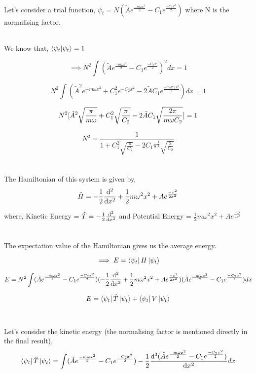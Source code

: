 \documentclass[12pt]{article}
\begin{document}
\noindent
\\
Let's consider a trial function, $\psi_t = N(\tilde{A}e^{\frac{-m \omega x^2}{2}} - C_1e^{\frac{-C_2 x^2}{2}})$ where N is the normalising factor. 

\noindent
\\
We know that, $\braket{\psi_t|\psi_t} = 1$

 \[ \implies N^2 \int (\tilde{A}e^{\frac{-m \omega x^2}{2}} - C_1e^{\frac{-C_2 x^2}{2}})^2 dx = 1\]


\[ N^2 \int(\tilde{A}^2 e^{-m \omega x^2} + C_1^2 e^{-C_2 x^2} - 2\tilde{A}C_1 e^{\frac{-m \omega C_2 x^2}{2}})dx = 1\]

\[ N^2 [\tilde{A}^2 \sqrt{\frac{\pi}{m \omega}} + C_1^2 \sqrt{\frac{\pi}{C_2}} - 2 \Tilde{A} C_1 \sqrt{{\frac{2 \pi}{m \omega C_2}}} ] = 1 \]

\begin{equation}
N^2 = \frac{1}{1 + C_1^2 \sqrt{\frac{\pi}{C_2}} - 2C_1 \pi^\frac{1}{4} \sqrt{\frac{2}{C_2}}} 
\end{equation}
\\
\\
The Hamiltonian of this system is given by, 
\[\hat{H} = -\frac{1}{2}\diff[2]{}{x} + \frac{1}{2}m\omega^2 x^{2} + A e^{\frac{-x^2}{2\sigma^2}}\]

where, Kinetic Energy = $\hat{T} =  -\frac{1}{2}\diff[2]{}{x}$ and Potential Energy = $\frac{1}{2}m\omega^2 x^{2} + A e^{\frac{-x^2}{2\sigma^2}}$
\\
\\
\\
The expectation value of the Hamiltonian gives us the average energy.

\[ \implies E = \bra{\psi_t}H\ket{\psi_t}\] 

\[E = N^2 \int (\tilde{A}e^{\frac{-m \omega x^2}{2}} - C_1e^{\frac{-C_2 x^2}{2}})( -\frac{1}{2}\diff[2]{}{x} + \frac{1}{2}m\omega^2 x^{2} + A e^{\frac{-x^2}{2\sigma^2}}) (\tilde{A}e^{\frac{-m \omega x^2}{2}} - C_1e^{\frac{-C_2 x^2}{2}}) dx\]

\[ E = \bra{\psi_t}\hat{T}\ket{\psi_t} + \bra{\psi_t}V\ket{\psi_t}\]
\\
\\
Let's consider the kinetic energy (the normalising factor is mentioned directly in the final result),
\[\bra{\psi_t}\hat{T}\ket{\psi_t} = \int(\tilde{A}e^{\frac{-m \omega x^2}{2}} - C_1e^{\frac{-C_2 x^2}{2}}) -\frac{1}{2}\diff[2]{(\tilde{A}e^{\frac{-m \omega x^2}{2}} - C_1e^{\frac{-C_2 x^2}{2}})}{x} dx \]
\end{document}
